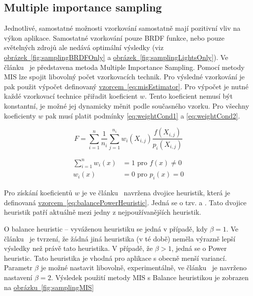 \documentclass[czech,master]{diploma}
\begin{document}
\subsection{Multiple importance sampling}
Jednotlivé, samostatné možnosti vzorkování samostatně mají pozitivní vliv na výkon aplikace. Samostatné vzorkování pouze BRDF funkce, nebo pouze světelných zdrojů ale nedává optimální výsledky (viz \hyperref[fig:samplingBRDFOnly]{obrázek~\ref{fig:samplingBRDFOnly}} a \hyperref[fig:samplingLightsOnly]{obrázek~\ref{fig:samplingLightsOnly}}). Ve článku~\cite{Guibas1997RobustMC} je představena metoda Multiple Importance Sampling. Pomocí metody MIS lze spojit libovolný počet vzorkovacích technik. Pro výsledné vzorkování je pak použit výpočet definovaný \hyperref[eq:misEstimator]{vzorcem~\ref{eq:misEstimator}}. Pro výpočet je nutné každé vzorkovací technice přiřadit koeficient \(w\). Tento koeficient nemusí být konstantní, je možné jej dynamicky měnit podle současného vzorku. Pro všechny koeficienty \(w\) pak musí platit podmínky \hyperref[eq:weightCond1]{\ref{eq:weightCond1}} a  \hyperref[eq:weightCond2]{\ref{eq:weightCond2}}.

\begin{equation} \label{eq:misEstimator}
  F = \sum^{n}_{i=1}\frac{1}{n_i}\sum^{n_i}_{j=1}w_i(X_{i,j})\frac{f(X_{i,j})}{p_i(X_{i,j})}
\end{equation}

\begin{align}
  \sum^{n}_{i=1}w_i(x) & = 1 \text{~pro~}f\left( x \right) \neq 0 \label{eq:weightCond1} \\
  w_i\left( x \right)  & = 0 \text{~pro~}p_i\left( x \right) = 0 \label{eq:weightCond2}
\end{align}

Pro získání koeficientů \(w\) je ve článku~\cite{Guibas1997RobustMC} navržena dvojice heuristik, která je definovaná \hyperref[eq:balancePowerHeuristic]{vzorcem~\ref{eq:balancePowerHeuristic}}. Jedná se o tzv.  a . Tato dvojice heuristik patří aktuálně mezi jedny z nejpoužívanějších heuristik.\par
O balance heuristic -- vyváženou heuristiku se jedná v případě, kdy \(\beta = 1\). Ve článku~\cite{Guibas1997RobustMC} je tvrzení, že žádná jiná heuristika (v té době) neměla výrazně lepší výsledky než právě tato heuristika. V případě, že \(\beta > 1\), jedná se o Power heuristic. Tato heuristika je vhodná pro aplikace s obecně menší variancí. Parametr \(\beta\) je možné nastavit libovolně, experimentálně, ve článku~\cite{Guibas1997RobustMC} je navrženo nastavení \(\beta = 2\). Výsledek použití metody MIS s Balance heuristikou je zobrazen na \hyperref[fig:samplingMIS]{obrázku~\ref{fig:samplingMIS}}
\end{document}
